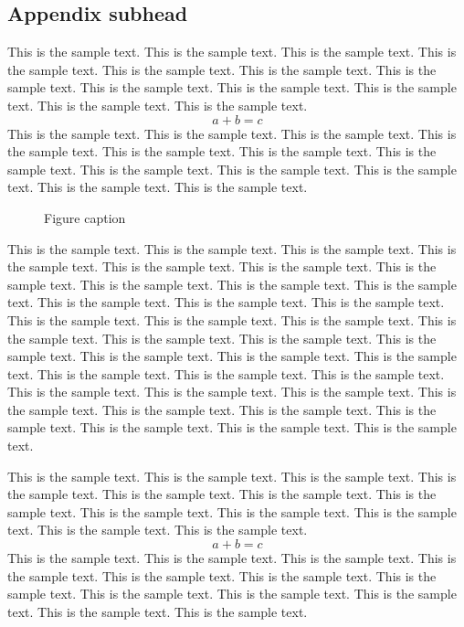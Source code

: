 \documentclass[preprint]{ptephy_v1}%
\begin{document}
\subsection{Appendix subhead}
This is the sample text. This is the sample text. This is the sample text. This is the sample text.
This is the sample text. This is the sample text. This is the sample text. This is the sample text.
This is the sample text. This is the sample text. This is the sample text. This is the sample text.
\begin{equation}
a + b = c
\end{equation}
This is the sample text. This is the sample text. This is the sample text. This is the sample text.
This is the sample text. This is the sample text. This is the sample text. This is the sample text.
This is the sample text. This is the sample text. This is the sample text. This is the sample text.

\begin{figure}[!h]
\caption{Figure caption}
\end{figure}

This is the sample text. This is the sample text. This is the sample text. This is the sample text.
This is the sample text. This is the sample text. This is the sample text. This is the sample text.
This is the sample text. This is the sample text. This is the sample text. This is the sample text.
This is the sample text. This is the sample text. This is the sample text. This is the sample text.
This is the sample text. This is the sample text. This is the sample text. This is the sample text.
This is the sample text. This is the sample text. This is the sample text. This is the sample text.
This is the sample text. This is the sample text. This is the sample text. This is the sample text.
This is the sample text. This is the sample text. This is the sample text. This is the sample text.
This is the sample text. This is the sample text. This is the sample text. This is the sample text.


This is the sample text. This is the sample text. This is the sample text. This is the sample text.
This is the sample text. This is the sample text. This is the sample text. This is the sample text.
This is the sample text. This is the sample text. This is the sample text. This is the sample text.
\begin{equation}
a + b = c
\end{equation}
This is the sample text. This is the sample text. This is the sample text. This is the sample text.
This is the sample text. This is the sample text. This is the sample text. This is the sample text.
This is the sample text. This is the sample text. This is the sample text. This is the sample text.
\end{document}
